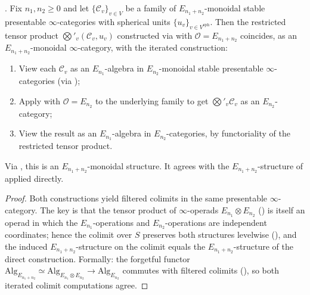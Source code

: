 \begin{proposition}
\label{v4-arith:tate:prop:dunn-compat}
\ClaimStatusProvedHere. Fix \(n_{1},n_{2}\geq 0\) and let
\(\{\mathcal{C}_{v}\}_{v\in V}\) be a family of
\(E_{n_{1}+n_{2}}\)-monoidal stable presentable \(\infty\)-categories
with spherical units \(\{u_{v}\}_{v\in V^{\mathrm{sph}}}\). Then the
restricted tensor product
\(\bigotimes'_{v}(\mathcal{C}_{v},u_{v})\) constructed via
 with
\(\mathcal{O}=E_{n_{1}+n_{2}}\) coincides, as an
\(E_{n_{1}+n_{2}}\)-monoidal \(\infty\)-category, with the iterated
construction:
\begin{enumerate}
\item[(a)] View each \(\mathcal{C}_{v}\) as an \(E_{n_{1}}\)-algebra in
\(E_{n_{2}}\)-monoidal stable presentable \(\infty\)-categories (via
);
\item[(b)] Apply  with
\(\mathcal{O}=E_{n_{2}}\) to the underlying family to get
\(\bigotimes'_{v}\mathcal{C}_{v}\) as an \(E_{n_{2}}\)-category;
\item[(c)] View the result as an \(E_{n_{1}}\)-algebra in
\(E_{n_{2}}\)-categories, by functoriality of the restricted tensor
product.
\end{enumerate}
Via , this is an
\(E_{n_{1}+n_{2}}\)-monoidal structure. It agrees with the
\(E_{n_{1}+n_{2}}\)-structure of
 applied directly.
\end{proposition}

\begin{proof}
Both constructions yield filtered colimits in the same
presentable \(\infty\)-category. The key is that the tensor product
of \(\infty\)-operads \(E_{n_{1}}\otimes E_{n_{2}}\)
() is itself an operad in
which the \(E_{n_{1}}\)-operations and \(E_{n_{2}}\)-operations are
independent coordinates; hence the colimit over \(S\) preserves both
structures levelwise
(), and the
induced \(E_{n_{1}+n_{2}}\)-structure on the colimit equals the
\(E_{n_{1}+n_{2}}\)-structure of the direct construction.
Formally: the forgetful functor
\(\mathrm{Alg}_{E_{n_{1}+n_{2}}}\simeq\mathrm{Alg}_{E_{n_{1}}\otimes E_{n_{2}}}\to\mathrm{Alg}_{E_{n_{2}}}\)
commutes with filtered colimits
(), so both
iterated colimit computations agree.
\end{proof}


